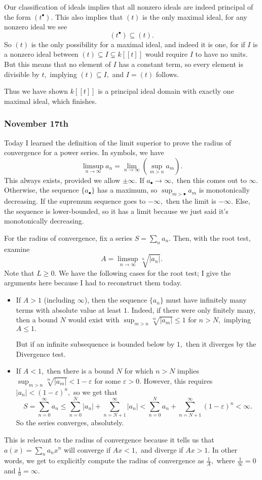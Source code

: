 Our classification of ideals implies that all nonzero ideals are indeed principal of the form $\left(t^\bullet\right).$ This also implies that $(t)$ is the only maximal ideal, for any nonzero ideal we see
\[\left(t^\bullet\right)\subseteq(t).\]
So $(t)$ is the only possibility for a maximal ideal, and indeed it is one, for if $I$ is a nonzero ideal between $(t)\subseteq I\subsetneq k[[t]]$ would require $I$ to have no units. But this means that no element of $I$ has a constant term, so every element is divisible by $t,$ implying $(t)\subseteq I,$ and $I=(t)$ follows.

Thus we have shown $k[[t]]$ is a principal ideal domain with exactly one maximal ideal, which finishes.

\subsubsection{November 17th}
Today I learned the definition of the limit superior to prove the radius of convergence for a power series. In symbols, we have
\[\limsup_{n\to\infty}a_n=\lim_{n\to\infty}\left(\sup_{m>n}a_m\right).\]
This always exists, provided we allow $\pm\infty.$ If $a_\bullet\to\infty,$ then this comes out to $\infty.$ Otherwise, the sequence $\{a_\bullet\}$ has a maximum, so $\sup_{m>\bullet}a_m$ is monotonically decreasing. If the supremum sequence goes to $-\infty,$ then the limit is $-\infty.$ Else, the sequence is lower-bounded, so it has a limit because we just said it's monotonically decreasing.

For the radius of convergence, fix a series $S=\sum_na_n.$ Then, with the root test, examine
\[A=\limsup_{n\to\infty}\sqrt[n]{\left|a_n\right|}.\]
Note that $L\ge0.$ We have the following cases for the root test; I give the arguments here because I had to reconstruct them today.
\begin{itemize}
    \item If $A>1$ (including $\infty$), then the sequence $\{a_n\}$ must have infinitely many terms with absolute value at least $1.$ Indeed, if there were only finitely many, then a bound $N$ would exist with $\sup_{m>n}\sqrt[m]{|a_m|}\le1$ for $n>N,$ implying $A\le1.$
    
    But if an infinite subsequence is bounded below by $1,$ then it diverges by the Divergence test.
    
    \item If $A<1,$ then there is a bound $N$ for which $n>N$ implies $\sup_{m>n}\sqrt[m]{|a_m|}<1-\varepsilon$ for some $\varepsilon>0.$ However, this requires $|a_n|<(1-\varepsilon)^n,$ so we get that
    \[S=\sum_{n=0}^\infty a_n\le\sum_{n=0}^N|a_n|+\sum_{n=N+1}^\infty|a_n|<\sum_{n=0}^Na_n+\sum_{n=N+1}^\infty(1-\varepsilon)^n<\infty.\]
    So the series converges, absolutely.
\end{itemize}
This is relevant to the radius of convergence because it tells us that $a(x)=\sum_na_nx^n$ will converge if $Ax<1,$ and diverge if $Ax>1.$ In other words, we get to explicitly compute the radius of convergence as $\frac1A,$ where $\frac1\infty=0$ and $\frac10=\infty.$

